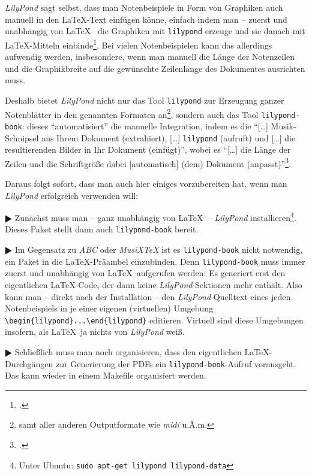 \textit{LilyPond} sagt selbst, dass man Notenbeispiele in Form von Graphiken auch
manuell in den \LaTeX-Text einfügen könne, einfach indem man -- zuerst und
unabhängig von \LaTeX -- die Graphiken mit \texttt{lilypond} erzeuge und sie
danach mit \LaTeX-Mitteln einbinde\footcite[vgl.][20]{LilyPond2018e}. Bei vielen
Notenbeispielen kann das allerdings aufwendig werden, insbesondere, wenn man
manuell die Länge der Notenzeilen und die Graphikbreite auf die gewünschte
Zeilenlänge des Dokumentes ausrichten muss.

Deshalb bietet \textit{LilyPond} nicht nur das Tool \texttt{lilypond} zur
Erzeugung ganzer Notenblätter in den genannten Formaten an\footnote{samt aller
anderen Outputformate wie \textit{midi} u.Ä.m.}, sondern auch das Tool
\texttt{lilypond-book}: dieses \enquote{automatisiert} die manuelle Integration,
indem es die \enquote{[\ldots] Musik-Schnipsel aus Ihrem Dokument (extrahiert),
[\ldots] \texttt{lilypond} (aufruft) und [\ldots] die resultierenden Bilder in
Ihr Dokument (einfügt)}, wobei es \enquote{[\ldots] die Länge der Zeilen und die
Schriftgröße dabei [automatisch] (dem) Dokument
(anpasst)}\footcite[vgl.][20]{LilyPond2018e}.

Daraus folgt sofort, dass man auch hier einiges vorzubereiten hat, wenn man
\textit{LilyPond} erfolgreich verwenden will:

$\RHD$ Zunächst muss man -- ganz unabhängig von \LaTeX\ -- \textit{LilyPond}
installieren\footnote{Unter Ubuntu: \texttt{sudo apt-get lilypond
lilypond-data}}. Dieses Paket stellt dann auch \texttt{lilypond-book} bereit.
  
$\RHD$ Im Gegensatz zu \textit{ABC} oder \textit{MusiX\TeX} ist es
\texttt{lilypond-book} nicht notwendig, ein Paket in die \LaTeX-Präambel
einzubinden. Denn \texttt{lilypond-book} muss immer zuerst und unabhängig von
\LaTeX\ aufgerufen werden: Es generiert erst den eigentlichen \LaTeX-Code, der
dann keine \textit{LilyPond}-Sektionen mehr enthält. Also kann man -- direkt nach
der Installation -- den \textit{LilyPond}-Quelltext eines jeden Notenbeispiels in
je einer eigenen (virtuellen) Umgebung \verb|\begin{lilypond}...\end{lilypond}|
editieren. Virtuell sind diese Umgebungen insofern, als \LaTeX\ ja nichts von
\textit{LilyPond} weiß.

$\RHD$ Schließlich muss man noch organisieren, dass den eigentlichen
\LaTeX-Durchgängen zur Generierung der PDFs ein \texttt{lilypond-book}-Aufruf
vorausgeht. Das kann wieder in einem Makefile organisiert werden.

